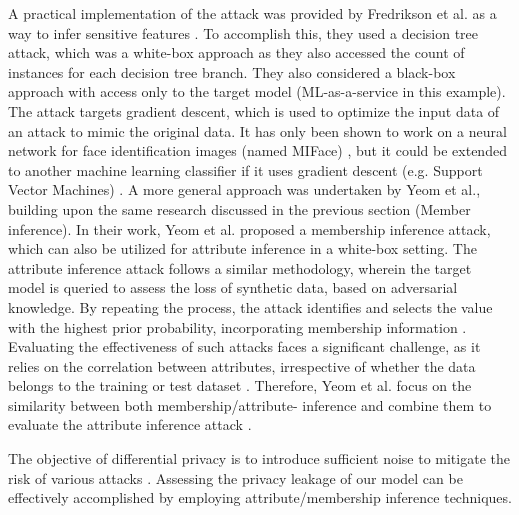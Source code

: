 A practical implementation of the attack was provided by Fredrikson et al. as a way to infer sensitive features \citep{fredrikson_model_2015}.
To accomplish this, they used a decision tree attack, which was a white-box approach as they also accessed the count of instances for each decision tree branch.
They also considered a black-box approach with access only to the target model (ML-as-a-service in this example).
The attack targets gradient descent, which is used to optimize the input data of an attack to mimic the original data.
It has only been shown to work on a neural network for face identification images (named MIFace) \citep{fredrikson_model_2015}, but it could be extended to another machine learning classifier if it uses gradient descent (e.g. Support Vector Machines) \citep{nicolae_adversarial_2019}.
A more general approach was undertaken by Yeom et al., building upon the same research discussed in the previous section (Member inference).
In their work, Yeom et al. proposed a membership inference attack, which can also be utilized for attribute inference in a white-box setting.
The attribute inference attack follows a similar methodology, wherein the target model is queried to assess the loss of synthetic data, based on adversarial knowledge.
By repeating the process, the attack identifies and selects the value with the highest prior probability, incorporating membership information \citep{yeom_privacy_2018,jayaraman_are_2022}.
Evaluating the effectiveness of such attacks faces a significant challenge, as it relies on the correlation between attributes, irrespective of whether the data belongs to the training or test dataset \citep{zhao_feasibility_2021}.
Therefore, Yeom et al. focus on the similarity between both membership/attribute- inference and combine them to evaluate the attribute inference attack \citep{yeom_privacy_2018}. \newline

The objective of differential privacy is to introduce sufficient noise to mitigate the risk of various attacks \citep{dwork_exposed_2017,jayaraman_evaluating_nodate}.
Assessing the privacy leakage of our model can be effectively accomplished by employing attribute/membership inference techniques.

